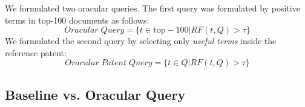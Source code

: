 We formulated two oracular queries. The first query was formulated by positive terms in top-100 documents as follows: 
\begin{equation}
Oracular \; Query = \{t \in \mathrm{top-100}|RF(t, Q)>\tau\}   
 \label{eq:score}
\end{equation}
We formulated the second query by selecting only {\em useful terms} inside the reference patent:
\begin{equation}
 Oracular \; Patent \; Query = \{t\in Q|RF(t, Q)>\tau\}   
 \label{eq:score}
\end{equation}

\subsection{Baseline vs. Oracular Query}

%
%
%
%

